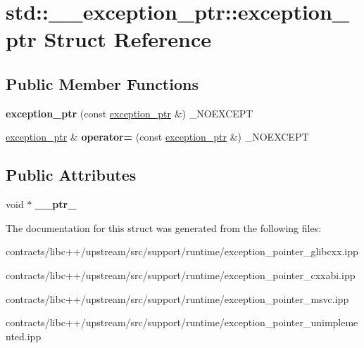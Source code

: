 \hypertarget{structstd_1_1____exception__ptr_1_1exception__ptr}{}\section{std\+:\+:\+\_\+\+\_\+exception\+\_\+ptr\+:\+:exception\+\_\+ptr Struct Reference}
\label{structstd_1_1____exception__ptr_1_1exception__ptr}
\subsection*{Public Member Functions}
\begin{DoxyCompactItemize}
\item 
\mbox{\label{structstd_1_1____exception__ptr_1_1exception__ptr_a315be76b8e4fdbf29d6bc3d809b4fa9c}} 
{\bfseries exception\+\_\+ptr} (const \mbox{\hyperlink{structstd_1_1____exception__ptr_1_1exception__ptr}{exception\+\_\+ptr}} \&) \+\_\+\+N\+O\+E\+X\+C\+E\+PT
\item 
\mbox{\label{structstd_1_1____exception__ptr_1_1exception__ptr_a7864ac689cc515d25c6d08ae042a6041}} 
\mbox{\hyperlink{structstd_1_1____exception__ptr_1_1exception__ptr}{exception\+\_\+ptr}} \& {\bfseries operator=} (const \mbox{\hyperlink{structstd_1_1____exception__ptr_1_1exception__ptr}{exception\+\_\+ptr}} \&) \+\_\+\+N\+O\+E\+X\+C\+E\+PT
\end{DoxyCompactItemize}
\subsection*{Public Attributes}
\begin{DoxyCompactItemize}
\item 
\mbox{\label{structstd_1_1____exception__ptr_1_1exception__ptr_a0e10851063386a202e14d3395ed43c49}} 
void $\ast$ {\bfseries \+\_\+\+\_\+ptr\+\_\+}
\end{DoxyCompactItemize}


The documentation for this struct was generated from the following files\+:\begin{DoxyCompactItemize}
\item 
contracts/libc++/upstream/src/support/runtime/exception\+\_\+pointer\+\_\+glibcxx.\+ipp\item 
contracts/libc++/upstream/src/support/runtime/exception\+\_\+pointer\+\_\+cxxabi.\+ipp\item 
contracts/libc++/upstream/src/support/runtime/exception\+\_\+pointer\+\_\+msvc.\+ipp\item 
contracts/libc++/upstream/src/support/runtime/exception\+\_\+pointer\+\_\+unimplemented.\+ipp\end{DoxyCompactItemize}
